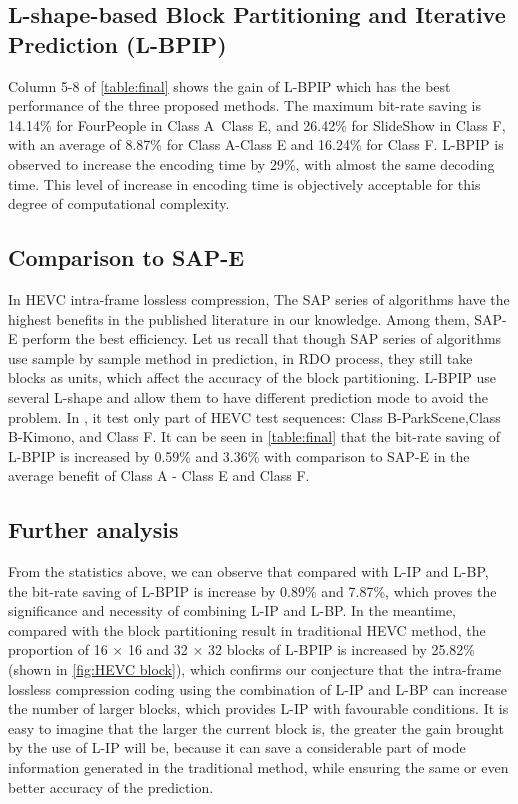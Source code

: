 \documentclass[journal]{IEEEtran}
\begin{document}
\subsection{L-shape-based Block Partitioning and Iterative Prediction (L-BPIP)}
Column 5-8 of \autoref{table:final} shows the gain of L-BPIP which has the best performance of the three proposed methods. The maximum bit-rate saving is 14.14\% for FourPeople in Class A~Class E, and 26.42\% for SlideShow in Class F, with an average of 8.87\% for Class A-Class E and 16.24\% for Class F. L-BPIP is observed to increase the encoding time by 29\%, with almost the same decoding time. This level of increase in encoding time is objectively acceptable for this degree of computational complexity.

\subsection{Comparison to SAP-E}
In HEVC intra-frame lossless compression, The SAP series of algorithms have the highest benefits in the published literature in our knowledge. Among them, SAP-E \cite{09} perform the best efficiency. Let us recall that though SAP series of algorithms use sample by sample method in prediction, in RDO process, they still take blocks as units, which affect the accuracy of the block partitioning. L-BPIP use several L-shape and allow them to have different prediction mode to avoid the problem. In \cite{09}, it test only part of HEVC test sequences: Class B-ParkScene,Class B-Kimono, and Class F. It can be seen in \autoref{table:final} that the bit-rate saving of L-BPIP is increased by 0.59\% and 3.36\% with comparison to SAP-E in the average benefit of Class A - Class E  and Class F. 
\subsection{Further analysis}
From the statistics above, we can observe that compared with L-IP and L-BP, the bit-rate saving of L-BPIP is increase by 0.89\% and 7.87\%, which proves the significance and necessity of combining L-IP and L-BP. In the meantime, compared with the block partitioning result in traditional HEVC method, the proportion of 16 × 16 and 32 × 32 blocks of L-BPIP is increased by 25.82\% (shown in \autoref{fig:HEVC block}), which confirms our conjecture that the intra-frame lossless compression coding using the combination of L-IP and L-BP can increase the number of larger blocks, which provides L-IP with favourable conditions. It is easy to imagine that the larger the current block is, the greater the gain brought by the use of L-IP will be, because it can save a considerable part of mode information generated in the traditional method, while ensuring the same or even better accuracy of the prediction.
\end{document}
